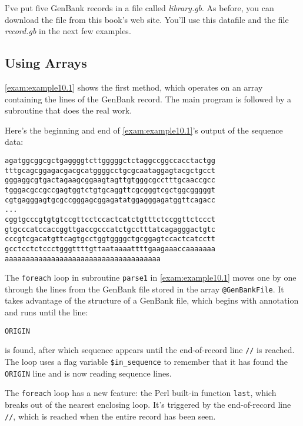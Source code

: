 I've put five GenBank records in a file called \textit{library.gb}. As before, you can download the file from this book's web site. You'll use this datafile and the file \textit{record.gb} in the next few examples.

\subsection{Using Arrays}
\autoref{exam:example10.1} shows the first method, which operates on an array containing the lines of the GenBank record. The main program is followed by a subroutine that does the real work.



Here's the beginning and end of \autoref{exam:example10.1}'s output of the sequence data:

\begin{lstlisting}
agatggcggcgctgaggggtcttgggggctctaggccggccacctactgg
tttgcagcggagacgacgcatggggcctgcgcaataggagtacgctgcct
gggaggcgtgactagaagcggaagtagttgtgggcgcctttgcaaccgcc
tgggacgccgccgagtggtctgtgcaggttcgcgggtcgctggcgggggt
cgtgagggagtgcgccgggagcggagatatggagggagatggttcagacc
...
cggtgcccgtgtgtccgttcctccactcatctgtttctccggttctccct
gtgcccatccaccggttgaccgcccatctgcctttatcagagggactgtc
cccgtcgacatgttcagtgcctggtggggctgcggagtccactcatcctt
gcctcctctccctgggttttgttaataaaattttgaagaaaccaaaaaaa
aaaaaaaaaaaaaaaaaaaaaaaaaaaaaaaaaaaaa
\end{lstlisting}

The \verb|foreach| loop in subroutine \verb|parse1| in \autoref{exam:example10.1} moves one by one through the lines from the GenBank file stored in the array \verb|@GenBankFile|. It takes advantage of the structure of a GenBank file, which begins with annotation and runs until the line:

\verb|ORIGIN|

is found, after which sequence appears until the end-of-record line \verb|//| is reached. The loop uses a flag variable \verb|$in_sequence| to remember that it has found the \verb|ORIGIN| line and is now reading sequence lines.

The \verb|foreach| loop has a new feature: the Perl built-in function \verb|last|, which breaks out of the nearest enclosing loop. It's triggered by the end-of-record line \verb|//|, which is reached when the entire record has been seen.

